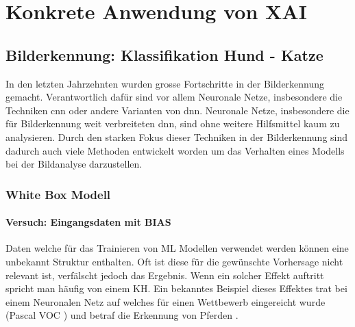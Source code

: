 \documentclass[
  12pt, %
  a4paper, %
  oneside, %
  openany, 
  numbers=noenddot, %
  BCOR=5mm, %
  parskip=half*, %
  thesis, %
]{bfhbook}
\begin{document}
\chapter{Konkrete Anwendung von XAI}

\section{Bilderkennung: Klassifikation Hund - Katze}

In den letzten Jahrzehnten wurden grosse Fortschritte in der Bilderkennung gemacht. Verantwortlich dafür sind vor allem Neuronale Netze, insbesondere die Techniken \acrfull{cnn} oder andere Varianten von \acrfull{dnn}. Neuronale Netze, insbesondere die für Bilderkennung weit verbreiteten \acrshort{dnn}, sind ohne weitere Hilfsmittel kaum zu analysieren.
Durch den starken Fokus dieser Techniken in der Bilderkennung sind dadurch auch viele Methoden entwickelt worden um das Verhalten eines Modells  bei der Bildanalyse darzustellen.

\subsection{White Box Modell}

\subsubsection*{Versuch: Eingangsdaten mit BIAS}
Daten welche für das Trainieren von \Gls{ML} Modellen verwendet werden können eine unbekannt Struktur enthalten. Oft ist diese für die gewünschte Vorhersage nicht relevant ist, verfälscht jedoch das  Ergebnis. Wenn ein solcher Effekt auftritt spricht man häufig von einem \Gls{KH}. Ein bekanntes Beispiel dieses Effektes trat bei einem Neuronalen Netz auf welches für einen Wettbewerb eingereicht wurde (Pascal VOC \cite{Everingham_thepascal}) und betraf die Erkennung von Pferden \parencite{Lapuschkin2019}. 
\end{document}
